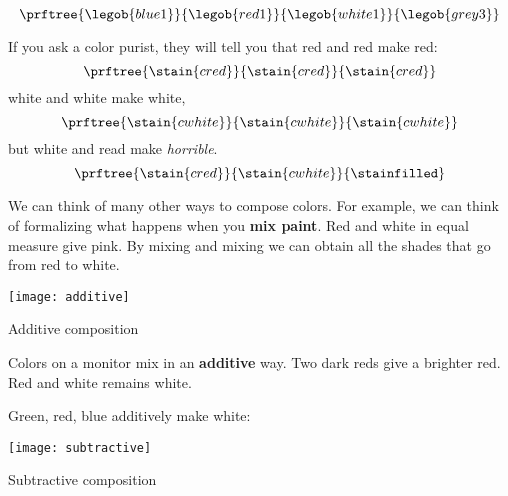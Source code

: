 \begin{equation}
\prftree{\legob{blue1}}{\legob{red1}}{\legob{white1}}{\legob{grey3}}
\end{equation}

If you ask a color purist, they will tell you that red and red make red:
%
\begin{equation}
  \prftree{\stain{cred}}{\stain{cred}}{\stain{cred}}
\end{equation}
%
white and white make white,
%
\begin{equation}
  \prftree{\stain{cwhite}}{\stain{cwhite}}{\stain{cwhite}}
\end{equation}
%
but white and read make \emph{horrible}.
%
\begin{equation}
\prftree{\stain{cred}}{\stain{cwhite}}{\stainfilled}
\end{equation}



We can think of many other ways to compose colors.
For example, we can think of formalizing what happens when you \textbf{mix paint}.
Red and white in equal measure give pink.
By mixing and mixing we can obtain all the shades that go from red to white.

\begin{center}
\end{center}

\begin{marginfigure}
  \texttt{[image: additive]}
  \caption{Additive composition}
\end{marginfigure}

Colors on a monitor mix in an \textbf{additive} way. Two dark reds give a brighter red.
Red and white remains white.

\begin{center}
\end{center}

Green, red, blue additively make white:


\begin{marginfigure}
  \texttt{[image: subtractive]}
  \caption{Subtractive composition}
\end{marginfigure}

